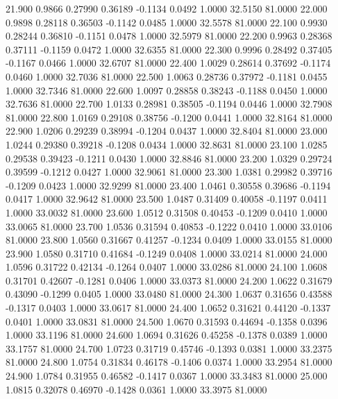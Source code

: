   21.900   0.9866   0.27990   0.36189  -0.1134   0.0492   1.0000  32.5150  81.0000
  22.000   0.9898   0.28118   0.36503  -0.1142   0.0485   1.0000  32.5578  81.0000
  22.100   0.9930   0.28244   0.36810  -0.1151   0.0478   1.0000  32.5979  81.0000
  22.200   0.9963   0.28368   0.37111  -0.1159   0.0472   1.0000  32.6355  81.0000
  22.300   0.9996   0.28492   0.37405  -0.1167   0.0466   1.0000  32.6707  81.0000
  22.400   1.0029   0.28614   0.37692  -0.1174   0.0460   1.0000  32.7036  81.0000
  22.500   1.0063   0.28736   0.37972  -0.1181   0.0455   1.0000  32.7346  81.0000
  22.600   1.0097   0.28858   0.38243  -0.1188   0.0450   1.0000  32.7636  81.0000
  22.700   1.0133   0.28981   0.38505  -0.1194   0.0446   1.0000  32.7908  81.0000
  22.800   1.0169   0.29108   0.38756  -0.1200   0.0441   1.0000  32.8164  81.0000
  22.900   1.0206   0.29239   0.38994  -0.1204   0.0437   1.0000  32.8404  81.0000
  23.000   1.0244   0.29380   0.39218  -0.1208   0.0434   1.0000  32.8631  81.0000
  23.100   1.0285   0.29538   0.39423  -0.1211   0.0430   1.0000  32.8846  81.0000
  23.200   1.0329   0.29724   0.39599  -0.1212   0.0427   1.0000  32.9061  81.0000
  23.300   1.0381   0.29982   0.39716  -0.1209   0.0423   1.0000  32.9299  81.0000
  23.400   1.0461   0.30558   0.39686  -0.1194   0.0417   1.0000  32.9642  81.0000
  23.500   1.0487   0.31409   0.40058  -0.1197   0.0411   1.0000  33.0032  81.0000
  23.600   1.0512   0.31508   0.40453  -0.1209   0.0410   1.0000  33.0065  81.0000
  23.700   1.0536   0.31594   0.40853  -0.1222   0.0410   1.0000  33.0106  81.0000
  23.800   1.0560   0.31667   0.41257  -0.1234   0.0409   1.0000  33.0155  81.0000
  23.900   1.0580   0.31710   0.41684  -0.1249   0.0408   1.0000  33.0214  81.0000
  24.000   1.0596   0.31722   0.42134  -0.1264   0.0407   1.0000  33.0286  81.0000
  24.100   1.0608   0.31701   0.42607  -0.1281   0.0406   1.0000  33.0373  81.0000
  24.200   1.0622   0.31679   0.43090  -0.1299   0.0405   1.0000  33.0480  81.0000
  24.300   1.0637   0.31656   0.43588  -0.1317   0.0403   1.0000  33.0617  81.0000
  24.400   1.0652   0.31621   0.44120  -0.1337   0.0401   1.0000  33.0831  81.0000
  24.500   1.0670   0.31593   0.44694  -0.1358   0.0396   1.0000  33.1196  81.0000
  24.600   1.0694   0.31626   0.45258  -0.1378   0.0389   1.0000  33.1757  81.0000
  24.700   1.0723   0.31719   0.45746  -0.1393   0.0381   1.0000  33.2375  81.0000
  24.800   1.0754   0.31834   0.46178  -0.1406   0.0374   1.0000  33.2954  81.0000
  24.900   1.0784   0.31955   0.46582  -0.1417   0.0367   1.0000  33.3483  81.0000
  25.000   1.0815   0.32078   0.46970  -0.1428   0.0361   1.0000  33.3975  81.0000
